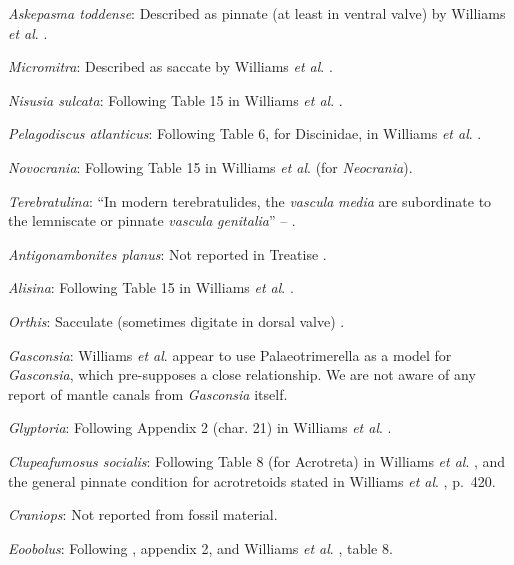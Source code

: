 \documentclass[]{book}
\theoremstyle{definition}
\theoremstyle{definition}
\theoremstyle{definition}
\theoremstyle{remark}
\begin{document}
\emph{Askepasma toddense}: Described as pinnate (at least in ventral
valve) by Williams \emph{et al}.
\citeyearpar[p.~250]{Williams1998Thediversity}.

\emph{Micromitra}: Described as saccate by Williams \emph{et al}.
\citeyearpar{Williams1998Thediversity}.

\emph{Nisusia sulcata}: Following Table 15 in Williams \emph{et al}.
\citeyearpar{Williams2000BrachiopodaLinguliformea}.

\emph{Pelagodiscus atlanticus}: Following Table 6, for Discinidae, in
Williams \emph{et al}.
\citeyearpar{Williams2000BrachiopodaLinguliformea}.

\emph{Novocrania}: Following Table 15 in Williams \emph{et al}.
\citeyearpar{Williams2000BrachiopodaLinguliformea} (for
\emph{Neocrania}).

\emph{Terebratulina}: ``In modern terebratulides, the \emph{vascula}
\emph{media} are subordinate to the lemniscate or pinnate \emph{vascula}
\emph{genitalia}'' -- \citet{Williams1997BrachiopodaRevised}.

\emph{Antigonambonites planus}: Not reported in Treatise
\citep{Williams2000BrachiopodaLinguliformea}.

\emph{Alisina}: Following Table 15 in Williams \emph{et al}.
\citeyearpar{Williams2000BrachiopodaLinguliformea}.

\emph{Orthis}: Sacculate (sometimes digitate in dorsal valve)
\citep[p716]{Williams2000BrachiopodaLinguliformea}.

\emph{Gasconsia}: Williams \emph{et al}. \citeyearpar[table
15]{Williams2000BrachiopodaLinguliformea} appear to use Palaeotrimerella
\citep[as drawn in][]{Williams1997BrachiopodaRevised} as a model for
\emph{Gasconsia}, which pre-supposes a close relationship. We are not
aware of any report of mantle canals from \emph{Gasconsia} itself.

\emph{Glyptoria}: Following Appendix 2 (char. 21) in Williams \emph{et
al}. \citeyearpar{Williams1998Thediversity}.

\emph{Clupeafumosus socialis}: Following Table 8 (for Acrotreta) in
Williams \emph{et al}.
\citeyearpar{Williams2000BrachiopodaLinguliformea}, and the general
pinnate condition for acrotretoids stated in Williams \emph{et al}.
\citeyearpar{Williams1997BrachiopodaRevised}, p.~420.

\emph{Craniops}: Not reported from fossil material.

\emph{Eoobolus}: Following \citet{Williams1998Thediversity}, appendix 2,
and Williams \emph{et al}.
\citeyearpar{Williams2000BrachiopodaLinguliformea}, table 8.
\end{document}
